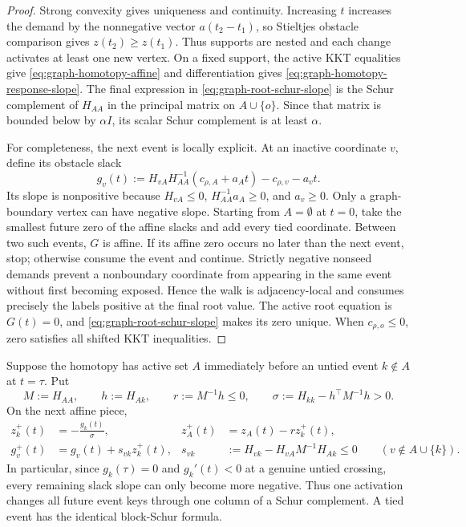 \begin{proof}
Strong convexity gives uniqueness and continuity.  Increasing $t$ increases
the demand by the nonnegative vector $a(t_2-t_1)$, so Stieltjes obstacle
comparison gives $z(t_2)\geq z(t_1)$.  Thus supports are nested and each
change activates at least one new vertex.  On a fixed support, the active KKT
equalities give \cref{eq:graph-homotopy-affine} and differentiation gives
\cref{eq:graph-homotopy-response-slope}.  The final expression in
\cref{eq:graph-root-schur-slope} is the Schur complement of $H_{AA}$ in the
principal matrix on $A\cup\{o\}$.  Since that matrix is bounded below by
$\alpha I$, its scalar Schur complement is at least $\alpha$.

For completeness, the next event is locally explicit.  At an inactive
coordinate $v$, define its obstacle slack
\begin{equation}
 g_v(t)
 :=H_{vA}H_{AA}^{-1}(c_{\rho,A}+a_At)
   -c_{\rho,v}-a_vt.
 \label{eq:graph-homotopy-slack}
\end{equation}
Its slope is nonpositive because $H_{vA}\leq0$,
$H_{AA}^{-1}a_A\geq0$, and $a_v\geq0$.  Only a graph-boundary vertex can
have negative slope.  Starting from $A=\emptyset$ at $t=0$, take the smallest
future zero of the affine slacks and add every tied coordinate.  Between two
such events, $G$ is affine.  If its affine zero occurs no later than the next
event, stop; otherwise consume the event and continue.  Strictly negative
nonseed demands prevent a nonboundary coordinate from appearing in the same
event without first becoming exposed.  Hence the walk is adjacency-local and
consumes precisely the labels positive at the final root value.  The active
root equation is $G(t)=0$, and \cref{eq:graph-root-schur-slope} makes its zero
unique.  When $c_{\rho,o}\leq0$, zero satisfies all shifted KKT inequalities.
\end{proof}

\begin{lemma}
\label{lem:one-event-schur-update}
Suppose the homotopy has active set $A$ immediately before an untied event
$k\notin A$ at $t=\tau$.  Put
\begin{equation}
 M:=H_{AA},
 \qquad h:=H_{Ak},
 \qquad r:=M^{-1}h\leq0,
 \qquad \sigma:=H_{kk}-h^\top M^{-1}h>0.
 \label{eq:event-schur-data}
\end{equation}
On the next affine piece,
\begin{align}
 z_k^+(t)&=-\frac{g_k(t)}{\sigma},
 &z_A^+(t)&=z_A(t)-r z_k^+(t),
 \label{eq:event-primal-update}\\
 g_v^+(t)&=g_v(t)+s_{vk}z_k^+(t),
 &s_{vk}&:=H_{vk}-H_{vA}M^{-1}H_{Ak}\leq0
 \qquad(v\notin A\cup\{k\}).
 \label{eq:event-slack-update}
\end{align}
In particular, since $g_k(\tau)=0$ and $g_k'(t)<0$ at a genuine untied
crossing, every remaining slack slope can only become more negative.  Thus
one activation changes all future event keys through one column of a Schur
complement.  A tied event has the identical block-Schur formula.
\end{lemma}

